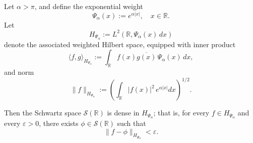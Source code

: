 \begin{lemma}\label{lem:density-schwartz-weighted-L2}
Let \( \alpha > \pi \), and define the exponential weight
\[
\Psi_\alpha(x) := e^{\alpha |x|}, \quad x \in \mathbb{R}.
\]
Let
\[
H_{\Psi_\alpha} := L^2(\mathbb{R}, \Psi_\alpha(x)\, dx)
\]
denote the associated weighted Hilbert space, equipped with inner product
\[
\langle f, g \rangle_{H_{\Psi_\alpha}} := \int_{\mathbb{R}} f(x) \overline{g(x)}\, \Psi_\alpha(x)\, dx,
\]
and norm
\[
\|f\|_{H_{\Psi_\alpha}} := \left( \int_{\mathbb{R}} |f(x)|^2\, e^{\alpha |x|} dx \right)^{1/2}.
\]

Then the Schwartz space \( \mathcal{S}(\mathbb{R}) \) is dense in \( H_{\Psi_\alpha} \); that is, for every \( f \in H_{\Psi_\alpha} \) and every \( \varepsilon > 0 \), there exists \( \phi \in \mathcal{S}(\mathbb{R}) \) such that
\[
\| f - \phi \|_{H_{\Psi_\alpha}} < \varepsilon.
\]
\end{lemma}
% 